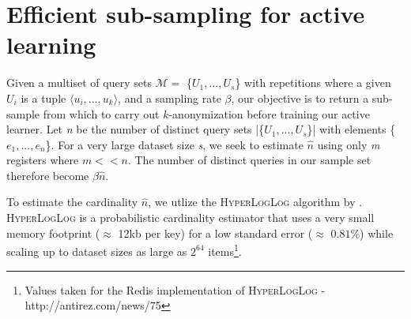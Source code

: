 \documentclass[letterpaper]{article}
\begin{document}
\section{Efficient sub-sampling for active learning}
\label{estimate_cardinality}

Given a multiset of query sets \begin{math} \mathcal{M} =  \end{math} \{\begin{math}U_1, ..., U_s \end{math}\} with repetitions where a given \begin{math} U_i \end{math} is a tuple \begin{math} \langle u_i, ..., u_k \rangle \end{math}, and a sampling rate $\beta$, our objective is to return a sub-sample from which to carry out $k$-anonymization before training our active learner. Let \textit{n} be the number of distinct query sets |\{\begin{math} U_1, ..., U_s \end{math}\}| with elements \{\begin{math} e_1, ..., e_n \end{math}\}. For a very large dataset size \textit{s}, we seek to estimate \begin{math} \hat{n} \end{math} using only \textit{m} registers where \begin{math} m << n \end{math}. The number of distinct queries in our sample set therefore become $\beta\hat{n}$.

To estimate the cardinality \begin{math} \hat{n} \end{math}, we utlize the \textsc{HyperLogLog} algorithm by \cite{flajolet2007hyperloglog}. \textsc{HyperLogLog} is a probabilistic cardinality estimator that uses a very small memory footprint (\begin{math} \approx \end{math} 12kb per key) for a low standard error (\begin{math} \approx \end{math} $0.81$\%) while scaling up to dataset sizes as large as \begin{math} 2^{64} \end{math} items\footnote{Values taken for the Redis implementation of \textsc{HyperLogLog} - http://antirez.com/news/75}. 
\end{document}
